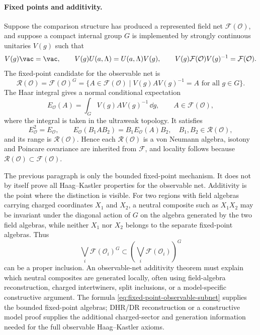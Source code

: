 \paragraph{Fixed points and additivity.}
Suppose the comparison structure has produced a represented field net
\(\mathcal F(\mathcal O)\), and suppose a compact internal group \(G\) is
implemented by strongly continuous unitaries \(V(g)\) such that
\[
  V(g)\vac=\vac,\qquad
  V(g)U(a,\Lambda)=U(a,\Lambda)V(g),
  \qquad
  V(g)\mathcal F(\mathcal O)V(g)^{-1}=\mathcal F(\mathcal O).
\]
The fixed-point candidate for the observable net is
\begin{equation}
  \mathcal R(\mathcal O)
  =
  \mathcal F(\mathcal O)^G
  =
  \{A\in\mathcal F(\mathcal O)\mid
    V(g)AV(g)^{-1}=A\text{ for all }g\in G\}.
  \label{eq:fixed-point-observable-subnet}
\end{equation}
The Haar integral gives a normal conditional expectation
\begin{equation}
  E_{\mathcal O}(A)
  =
  \int_G V(g)AV(g)^{-1}\,\dd g,
  \qquad
  A\in\mathcal F(\mathcal O),
  \label{eq:fixed-point-haar-expectation}
\end{equation}
where the integral is taken in the ultraweak topology.  It satisfies
\[
  E_{\mathcal O}^2=E_{\mathcal O},\qquad
  E_{\mathcal O}(B_1AB_2)=B_1E_{\mathcal O}(A)B_2,
  \quad B_1,B_2\in\mathcal R(\mathcal O),
\]
and its range is \(\mathcal R(\mathcal O)\).  Hence each
\(\mathcal R(\mathcal O)\) is a von Neumann algebra, isotony and Poincare
covariance are inherited from \(\mathcal F\), and locality follows because
\(\mathcal R(\mathcal O)\subset\mathcal F(\mathcal O)\).

The previous paragraph is only the bounded fixed-point mechanism.  It does
not by itself prove all Haag--Kastler properties for the observable net.
Additivity is the point where the distinction is visible.  For two regions
with field algebras carrying charged coordinates \(X_1\) and \(X_2\), a
neutral composite such as \(X_1X_2\) may be invariant under the diagonal
action of \(G\) on the algebra generated by the two field algebras, while
neither \(X_1\) nor \(X_2\) belongs to the separate fixed-point algebras.
Thus
\[
  \bigvee_i \mathcal F(\mathcal O_i)^G
  \subset
  \left(\bigvee_i\mathcal F(\mathcal O_i)\right)^G
\]
can be a proper inclusion.  An observable-net additivity theorem must explain
which neutral composites are generated locally, often using field-algebra
reconstruction, charged intertwiners, split inclusions, or a model-specific
constructive argument.  The formula
\eqref{eq:fixed-point-observable-subnet} supplies the bounded fixed-point
algebras; DHR/DR reconstruction or a constructive model proof supplies the
additional charged-sector and generation information needed for the full
observable Haag--Kastler axioms.

